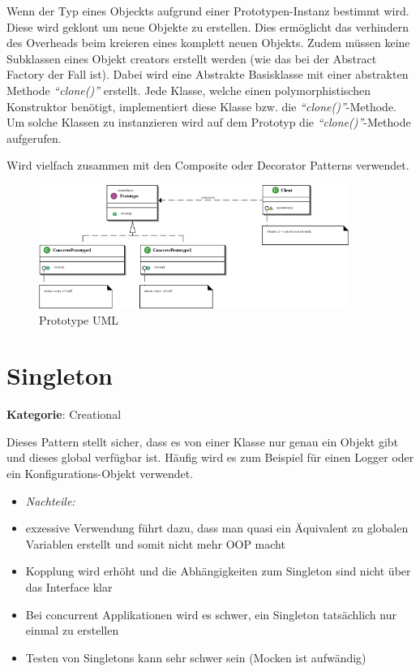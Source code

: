 Wenn der Typ eines Objeckts aufgrund einer Prototypen-Instanz bestimmt wird. Diese wird geklont um neue Objekte zu erstellen. Dies ermöglicht das verhindern des Overheads beim kreieren eines komplett neuen Objekts. Zudem müssen keine Subklassen eines Objekt creators erstellt werden (wie das bei der Abstract Factory der Fall ist).
Dabei wird eine Abstrakte Basisklasse mit einer abstrakten Methode \textit{``clone()''} erstellt. Jede Klasse, welche einen polymorphistischen Konstruktor benötigt, implementiert diese Klasse bzw. die \textit{``clone()''}-Methode.
Um solche Klassen zu instanzieren wird auf dem Prototyp die \textit{``clone()''}-Methode aufgerufen.

Wird vielfach zusammen mit den Composite oder Decorator Patterns verwendet.

\begin{figure}[H]
	\centering
	\includegraphics[width=0.9\textwidth]{content/gof/images/02-prototype-uml.png}
	\caption{Prototype UML}
\end{figure}


\section{Singleton}
\textbf{Kategorie}: Creational

Dieses Pattern stellt sicher, dass es von einer Klasse nur genau ein Objekt gibt und dieses global verfügbar ist.
Häufig wird es zum Beispiel für einen Logger oder ein Konfigurations-Objekt verwendet.

\begin{itemize}
	\item \textit{Nachteile:}
	\item exzessive Verwendung führt dazu, dass man quasi ein Äquivalent zu globalen Variablen erstellt und somit nicht mehr OOP macht
	\item Kopplung wird erhöht und die Abhängigkeiten zum Singleton sind nicht über das Interface klar
	\item Bei concurrent Applikationen wird es schwer, ein Singleton tatsächlich nur einmal zu erstellen
	\item Testen von Singletons kann sehr schwer sein (Mocken ist aufwändig)
\end{itemize}

